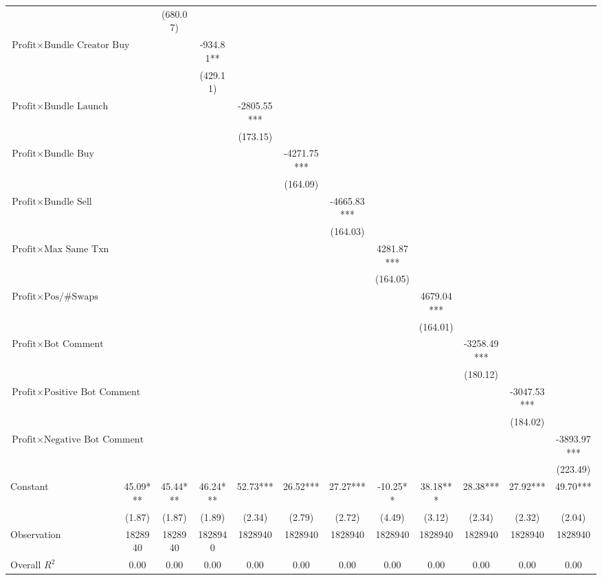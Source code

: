 \begin{tabular}{lccccccccccc}
&  & (680.07) &  &  &  &  &  &  &  &  &  \\
$\text{Profit} \times \text{Bundle Creator Buy}$&  &  & -934.81** &  &  &  &  &  &  &  &  \\
&  &  & (429.11) &  &  &  &  &  &  &  &  \\
$\text{Profit} \times \text{Bundle Launch}$&  &  &  & -2805.55*** &  &  &  &  &  &  &  \\
&  &  &  & (173.15) &  &  &  &  &  &  &  \\
$\text{Profit} \times \text{Bundle Buy}$&  &  &  &  & -4271.75*** &  &  &  &  &  &  \\
&  &  &  &  & (164.09) &  &  &  &  &  &  \\
$\text{Profit} \times \text{Bundle Sell}$&  &  &  &  &  & -4665.83*** &  &  &  &  &  \\
&  &  &  &  &  & (164.03) &  &  &  &  &  \\
$\text{Profit} \times \text{Max Same Txn}$&  &  &  &  &  &  & 4281.87*** &  &  &  &  \\
&  &  &  &  &  &  & (164.05) &  &  &  &  \\
$\text{Profit} \times \text{Pos/\#Swaps}$&  &  &  &  &  &  &  & 4679.04*** &  &  &  \\
&  &  &  &  &  &  &  & (164.01) &  &  &  \\
$\text{Profit} \times \text{Bot Comment}$&  &  &  &  &  &  &  &  & -3258.49*** &  &  \\
&  &  &  &  &  &  &  &  & (180.12) &  &  \\
$\text{Profit} \times \text{Positive Bot Comment}$&  &  &  &  &  &  &  &  &  & -3047.53*** &  \\
&  &  &  &  &  &  &  &  &  & (184.02) &  \\
$\text{Profit} \times \text{Negative Bot Comment}$&  &  &  &  &  &  &  &  &  &  & -3893.97*** \\
&  &  &  &  &  &  &  &  &  &  & (223.49) \\
Constant& 45.09*** & 45.44*** & 46.24*** & 52.73*** & 26.52*** & 27.27*** & -10.25** & 38.18*** & 28.38*** & 27.92*** & 49.70*** \\
& (1.87) & (1.87) & (1.89) & (2.34) & (2.79) & (2.72) & (4.49) & (3.12) & (2.34) & (2.32) & (2.04) \\
Observation& 1828940 & 1828940 & 1828940 & 1828940 & 1828940 & 1828940 & 1828940 & 1828940 & 1828940 & 1828940 & 1828940 \\
Overall $R^2$& 0.00 & 0.00 & 0.00 & 0.00 & 0.00 & 0.00 & 0.00 & 0.00 & 0.00 & 0.00 & 0.00 \\
\hline
\end{tabular}
